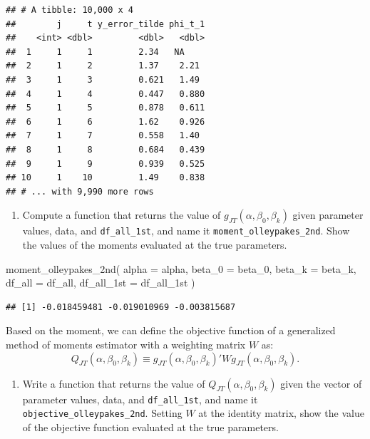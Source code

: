 \documentclass[
]{book}
\newenvironment{Shaded}{\begin{snugshade}}{\end{snugshade}}
\newcommand{\AttributeTok}[1]{\textcolor[rgb]{0.77,0.63,0.00}{#1}}
\newcommand{\FunctionTok}[1]{\textcolor[rgb]{0.00,0.00,0.00}{#1}}
\newcommand{\NormalTok}[1]{#1}
\providecommand{\tightlist}{%
  \setlength{\itemsep}{0pt}\setlength{\parskip}{0pt}}
\begin{document}
\begin{verbatim}
## # A tibble: 10,000 x 4
##        j     t y_error_tilde phi_t_1
##    <int> <dbl>         <dbl>   <dbl>
##  1     1     1         2.34   NA    
##  2     1     2         1.37    2.21 
##  3     1     3         0.621   1.49 
##  4     1     4         0.447   0.880
##  5     1     5         0.878   0.611
##  6     1     6         1.62    0.926
##  7     1     7         0.558   1.40 
##  8     1     8         0.684   0.439
##  9     1     9         0.939   0.525
## 10     1    10         1.49    0.838
## # ... with 9,990 more rows
\end{verbatim}

\begin{enumerate}
\def\labelenumi{\arabic{enumi}.}
\setcounter{enumi}{5}
\tightlist
\item
  Compute a function that returns the value of \(g_{JT}(\alpha, \beta_0, \beta_k)\) given parameter values, data, and \texttt{df\_all\_1st}, and name it \texttt{moment\_olleypakes\_2nd}. Show the values of the moments evaluated at the true parameters.
\end{enumerate}

\begin{Shaded}
\begin{Highlighting}[]
\FunctionTok{moment\_olleypakes\_2nd}\NormalTok{(}
  \AttributeTok{alpha =}\NormalTok{ alpha, }
  \AttributeTok{beta\_0 =}\NormalTok{ beta\_0, }
  \AttributeTok{beta\_k =}\NormalTok{ beta\_k, }
  \AttributeTok{df\_all =}\NormalTok{ df\_all, }
  \AttributeTok{df\_all\_1st =}\NormalTok{ df\_all\_1st}
\NormalTok{  )}
\end{Highlighting}
\end{Shaded}

\begin{verbatim}
## [1] -0.018459481 -0.019010969 -0.003815687
\end{verbatim}

Based on the moment, we can define the objective function of a generalized method of moments estimator with a weighting matrix \(W\) as:
\[
Q_{JT}(\alpha, \beta_0, \beta_k) \equiv g_{JT}(\alpha, \beta_0, \beta_k)' W g_{JT}(\alpha, \beta_0, \beta_k).
\]

\begin{enumerate}
\def\labelenumi{\arabic{enumi}.}
\setcounter{enumi}{6}
\tightlist
\item
  Write a function that returns the value of \(Q_{JT}(\alpha, \beta_0, \beta_k)\) given the vector of parameter values, data, and \texttt{df\_all\_1st}, and name it \texttt{objective\_olleypakes\_2nd}. Setting \(W\) at the identity matrix, show the value of the objective function evaluated at the true parameters.
\end{enumerate}
\end{document}
